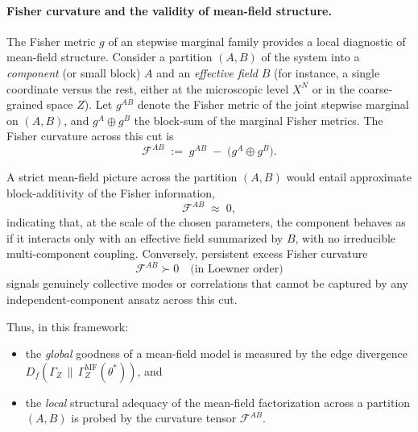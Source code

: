 \documentclass[11pt]{article}
\newcommand{\1}{\mathbf{1}}
\begin{document}
\paragraph{Fisher curvature and the validity of mean-field structure.}
The Fisher metric $g$ of an stepwise marginal family provides a local diagnostic of mean-field structure. Consider a partition $(A,B)$ of the system into a \emph{component} (or small block) $A$ and an \emph{effective field} $B$ (for instance, a single coordinate versus the rest, either at the microscopic level $X^N$ or in the coarse-grained space $Z$). Let $g^{AB}$ denote the Fisher metric of the joint stepwise marginal on $(A,B)$, and $g^A \oplus g^B$ the block-sum of the marginal Fisher metrics. The Fisher curvature across this cut is
\[
\mathcal F^{AB}
\;:=\;
g^{AB} \;-\; \big(g^A \oplus g^B\big).
\]

A strict mean-field picture across the partition $(A,B)$ would entail approximate block-additivity of the Fisher information,
\[
\mathcal F^{AB} \;\approx\; 0,
\]
indicating that, at the scale of the chosen parameters, the component behaves as if it interacts only with an effective field summarized by $B$, with no irreducible multi-component coupling. Conversely, persistent excess Fisher curvature
\[
\mathcal F^{AB} \succ 0 \quad \text{(in Loewner order)}
\]
signals genuinely collective modes or correlations that cannot be captured by any independent-component ansatz across this cut.

Thus, in this framework:
\begin{itemize}[leftmargin=1.6em]
  \item the \emph{global} goodness of a mean-field model is measured by the edge divergence $D_f(\Gamma_Z \,\|\, \Gamma_Z^{\mathrm{MF}}(\theta^\ast))$, and
  \item the \emph{local} structural adequacy of the mean-field factorization across a partition $(A,B)$ is probed by the curvature tensor $\mathcal F^{AB}$.
\end{itemize}
\end{document}
